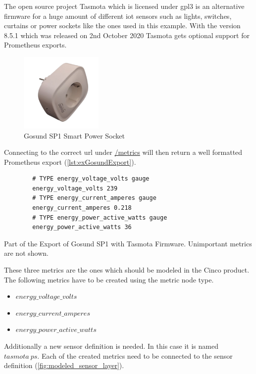 The open source project Tasmota \cite{tasmotawebsite} which is licensed under \gls{gpl3} is an alternative firmware for a huge amount of different \gls{iot} sensors such as lights, switches, curtains or power sockets like the ones used in this example.
With the version 8.5.1 which was released on 2nd October 2020 Tasmota gets optional support for Prometheus exports. 

\begin{figure}[!ht]
	\centering
	\includegraphics[width=4cm]{assets/images/gosund.png}
	\caption{Gosund SP1 Smart Power Socket}
	\label{fig:gosund_sp1}
\end{figure}

Connecting to the correct \gls{url} under \url{/metrics} will then return a well formatted Prometheus export (\cref{lst:exGosundExport}).

\begin{listing}[!ht]
	\begin{verbatim}
		# TYPE energy_voltage_volts gauge
		energy_voltage_volts 239
		# TYPE energy_current_amperes gauge
		energy_current_amperes 0.218
		# TYPE energy_power_active_watts gauge
		energy_power_active_watts 36
	\end{verbatim}
	\caption[Part of the Export of Gosund SP1 with Tasmota Firmware]{Part of the Export of Gosund SP1 with Tasmota Firmware. Unimportant metrics are not shown.}
	\label{lst:exGosundExport}
\end{listing}

These three metrics are the ones which should be modeled in the Cinco product. The following metrics have to be created using the metric node type. 

\begin{itemize}
	\item $energy\_voltage\_volts$
	\item $energy\_current\_amperes$
	\item $energy\_power\_active\_watts$ 
\end{itemize}

Additionally a new sensor definition is needed. In this case it is named $tasmota\ ps$. Each of the created metrics need to be connected to the sensor definition (\cref{fig:modeled_sensor_layer}).

